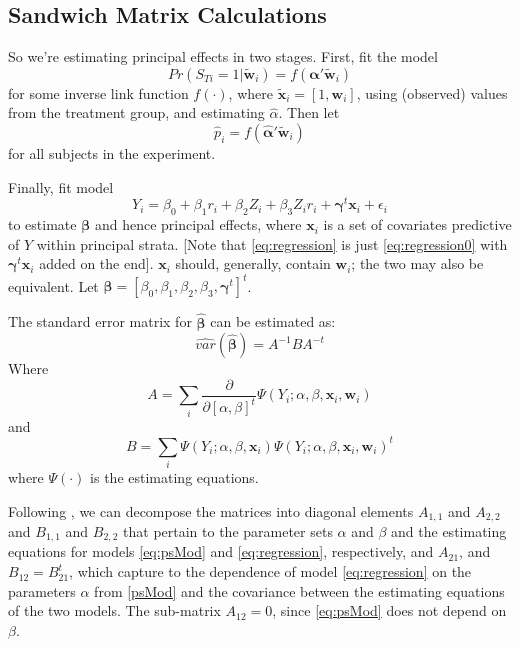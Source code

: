 \documentclass[11pt]{article} %
\begin{document}
\subsection{Sandwich Matrix Calculations}


So we're estimating principal effects in two stages.
First, fit the model
\begin{equation}\label{eq:psMod}
  Pr(S_{Ti}=1|\bm{\tilde{w}}_i)=f(\bm{\alpha}'\bm{\tilde{w}}_i)
\end{equation}
for some inverse link function $f(\cdot)$, where $\bm{\tilde{x}}_i=[1,\bm{w}_i]$, using (observed) values from the treatment group, and estimating $\hat{\alpha}$.
Then let
\begin{equation}\label{eq:ps}
  \hat{p}_i=f(\bm{\hat{\alpha}}'\bm{\tilde{w}}_i)
\end{equation}
for all subjects in the experiment.

Finally, fit model
\begin{equation}\label{eq:regression}
  Y_i=\beta_0+\beta_1r_i+\beta_2Z_i+\beta_3Z_ir_i+\bm{\gamma}^t\bm{x}_i+\epsilon_i
\end{equation}
to estimate $\bm{\beta}$ and hence principal effects, where $\bm{x}_i$ is a set of covariates predictive of $Y$ within principal strata.
[Note that \eqref{eq:regression} is just \eqref{eq:regression0} with $\bm{\gamma}^t\bm{x}_i$ added on the end].
$\bm{x}_i$ should, generally, contain $\bm{w}_i$; the two may also be equivalent.
Let $\bm{\beta}=[\beta_0,\beta_1,\beta_2,\beta_3,\bm{\gamma}^t]^t$.

The standard error matrix for $\bm{\hat{\beta}}$ can be estimated as:
\begin{equation}\label{eq:sandwich}
  \widehat{var}(\bm{\hat{\beta}})=A^{-1}BA^{-t}
\end{equation}
Where
\begin{equation}\label{eq:Amat}
  A=\sum_i\frac{\partial}{\partial [\alpha,\beta]^t} \Psi(Y_i;\alpha,\beta,\bm{x}_i,\bm{w}_i)
\end{equation}
and
\begin{equation}\label{eq:Bmat}
  B=\sum_i \Psi(Y_i;\alpha,\beta,\bm{x}_i)\Psi(Y_i;\alpha,\beta,\bm{x}_i,\bm{w}_i)^t
\end{equation}
where $\Psi(\cdot)$ is the estimating equations.

Following \citet[][p. 373]{carroletal06}, we %
can decompose the matrices into diagonal elements $A_{1,1}$ and $A_{2,2}$ and $B_{1,1}$ and $B_{2,2}$ that pertain to the parameter sets $\alpha$ and $\beta$ and the estimating equations for models \eqref{eq:psMod} and  \eqref{eq:regression}, respectively, and $A_{21}$, and $B_{12}=B_{21}^t$, which capture to the dependence of model \eqref{eq:regression} on the parameters $\alpha$ from \eqref{psMod} and the covariance between the estimating equations of the two models. The sub-matrix $A_{12}=0$, since \eqref{eq:psMod} does not depend on $\beta$.
\end{document}
